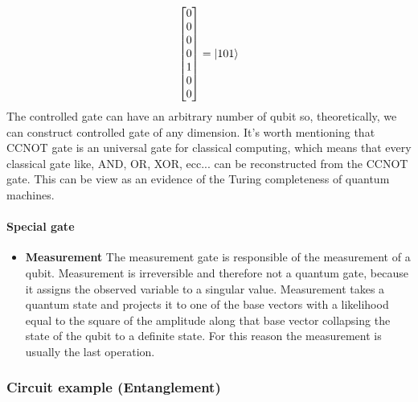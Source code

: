 \documentclass[main.tex]{subfiles}
\theoremstyle{definition}
\begin{document}
\begin{itemize}
$$\begin{bmatrix}
	0\\
	0\\
	0\\
	0\\
	1\\
	0\\
	0\\
	\end{bmatrix}
	=
	\ket{101}
	$$
	The controlled gate can have an arbitrary number of qubit so, theoretically, we can construct controlled gate of 
	any dimension. It's worth mentioning that CCNOT gate is an universal gate for classical computing, which means 
	that every classical gate like, AND, OR, XOR, ecc... can be reconstructed from the CCNOT gate. This can be view 
	as an evidence of the Turing completeness of quantum machines.
	\end{itemize}
	
	\paragraph{Special gate}
	\begin{itemize}
	\item \textbf{Measurement} The measurement gate is responsible of the measurement of a qubit. Measurement is irreversible 
	and therefore not a quantum gate, because it assigns the observed variable to a singular value. Measurement takes a quantum state 
	and projects it to one of the base vectors with a likelihood equal to the square of the amplitude along that base vector collapsing 
	the state of the qubit to a definite state. For this reason the measurement is usually the last operation.
	\end{itemize}
	
	\subsubsection{Circuit example (Entanglement)}
	
\end{document}
